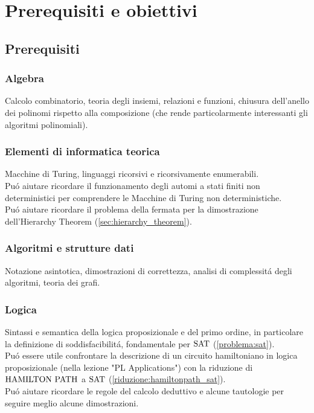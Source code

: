 \section*{Prerequisiti e obiettivi}

\subsection{Prerequisiti}
\subsubsection*{Algebra} 
Calcolo combinatorio, teoria degli insiemi, relazioni e funzioni, chiusura dell'anello dei polinomi rispetto alla composizione (che rende particolarmente interessanti gli algoritmi polinomiali).

\subsubsection*{Elementi di informatica teorica} 
Macchine di Turing, linguaggi ricorsivi e ricorsivamente enumerabili.\\
Puó aiutare ricordare il funzionamento degli automi a stati finiti non deterministici per comprendere le Macchine di Turing non deterministiche.\\
Puó aiutare ricordare il problema della fermata per la dimostrazione dell'Hierarchy Theorem (\ref{sec:hierarchy_theorem}).

\subsubsection*{Algoritmi e strutture dati} 
Notazione asintotica, dimostrazioni di correttezza, analisi di complessitá degli algoritmi, teoria dei grafi.

\subsubsection*{Logica}
Sintassi e semantica della logica proposizionale e del primo ordine, in particolare la definizione di soddisfacibilitá, fondamentale per $\text{SAT}$ (\ref{problema:sat}). \\
Puó essere utile confrontare la descrizione di un circuito hamiltoniano in logica proposizionale (nella lezione "PL Applications") con la riduzione di $\text{HAMILTON PATH}$ a $\text{SAT}$ (\ref{riduzione:hamiltonpath_sat}).\\
Puó aiutare ricordare le regole del calcolo deduttivo e alcune tautologie per seguire meglio alcune dimostrazioni.

